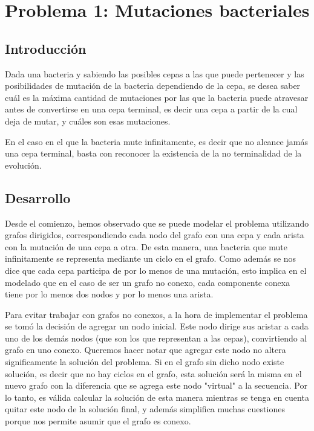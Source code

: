 \section{Problema 1: Mutaciones bacteriales}
 
\subsection{Introducci\'on}

\quad Dada una bacteria y sabiendo las posibles cepas a las que puede pertenecer y las posibilidades de mutación de la bacteria dependiendo de la cepa, se desea saber cuál es la máxima cantidad de mutaciones por las que la bacteria puede atravesar antes de convertirse en una cepa terminal, es decir una cepa a partir de la cual deja de mutar, y cuáles son esas mutaciones.

\quad En el caso en el que la bacteria mute infinitamente, es decir que no alcance jamás una cepa terminal, basta con reconocer la existencia de la no terminalidad de la evolución.
 
\subsection{Desarrollo}
 
\quad Desde el comienzo, hemos observado que se puede modelar el problema utilizando grafos dirigidos, correspondiendo cada nodo del grafo con una cepa y cada arista con la mutación de una cepa a otra. De esta manera, una bacteria que mute infinitamente se representa mediante un ciclo en el grafo. Como además se nos dice que cada cepa participa de por lo menos de una mutación, esto implica en el modelado que en el caso de ser un grafo no conexo, cada componente conexa tiene por lo menos dos nodos y por lo menos una arista.

\quad Para evitar trabajar con grafos no conexos, a la hora de implementar el problema se tomó la decisión de agregar un nodo inicial. Este nodo dirige sus aristar a cada uno de los demás nodos (que son los que representan a las cepas), convirtiendo al grafo en uno conexo. Queremos hacer notar que agregar este nodo no altera significamente la solución del problema. Si en el grafo sin dicho nodo existe solución, es decir que no hay ciclos en el grafo, esta solución será la misma en el nuevo grafo con la diferencia que se agrega este nodo "virtual" a la secuencia. Por lo tanto, es válida calcular la solución de esta manera mientras se tenga en cuenta quitar este nodo de la solución final, y además simplifica muchas cuestiones porque nos permite asumir que el grafo es conexo.

